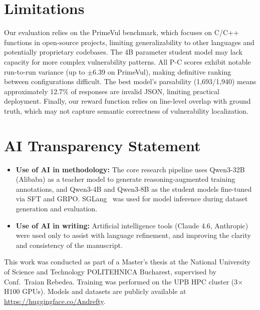 \documentclass{article}
\begin{document}
\section{Limitations}

Our evaluation relies on the PrimeVul benchmark, which focuses on C/C++ functions in open-source projects, limiting generalizability to other languages and potentially proprietary codebases. The 4B parameter student model may lack capacity for more complex vulnerability patterns. All P-C scores exhibit notable run-to-run variance (up to $\pm$6.39 on PrimeVul), making definitive ranking between configurations difficult. The best model's parsability (1,693/1,940) means approximately 12.7\% of responses are invalid JSON, limiting practical deployment. Finally, our reward function relies on line-level overlap with ground truth, which may not capture semantic correctness of vulnerability localization.

\section{AI Transparency Statement}
\begin{itemize}
    \item \textbf{Use of AI in methodology:} The core research pipeline uses Qwen3-32B (Alibaba) as a teacher model to generate reasoning-augmented training annotations, and Qwen3-4B and Qwen3-8B as the student models fine-tuned via SFT and GRPO. SGLang~\cite{sglang} was used for model inference during dataset generation and evaluation.
    \item \textbf{Use of AI in writing:} Artificial intelligence tools (Claude 4.6, Anthropic) were used only to assist with language refinement, and improving the clarity and consistency of the manuscript.
\end{itemize}

\begin{ack}
This work was conducted as part of a Master's thesis at the National University of Science and Technology POLITEHNICA Bucharest, supervised by Conf.\ Traian Rebedea. Training was performed on the UPB HPC cluster (3$\times$H100 GPUs). Models and datasets are publicly available at \url{https://huggingface.co/Andrefty}.
\end{ack}

\small{


}
\end{document}
